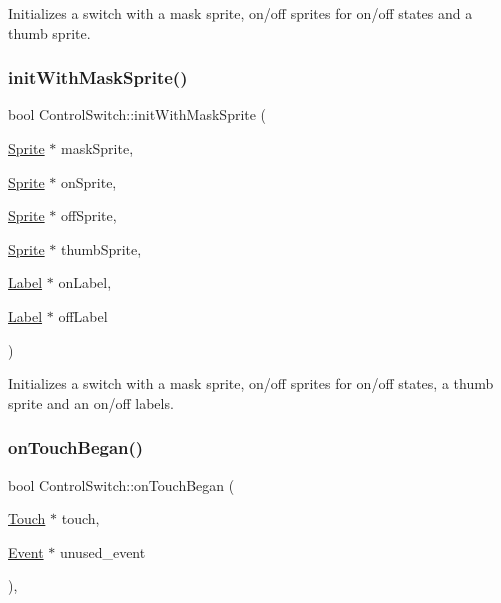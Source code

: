 Initializes a switch with a mask sprite, on/off sprites for on/off states and a thumb sprite. \mbox{\label{classControlSwitch_adea9bc3322f3cc28ea660cb5d4b02b65}} 
\subsubsection{\texorpdfstring{init\+With\+Mask\+Sprite()}{initWithMaskSprite()}\hspace{0.1cm}{\footnotesize\ttfamily [4/4]}}
{\footnotesize\ttfamily bool Control\+Switch\+::init\+With\+Mask\+Sprite (\begin{DoxyParamCaption}\item[{\hyperlink{classSprite}{Sprite} $\ast$}]{mask\+Sprite,  }\item[{\hyperlink{classSprite}{Sprite} $\ast$}]{on\+Sprite,  }\item[{\hyperlink{classSprite}{Sprite} $\ast$}]{off\+Sprite,  }\item[{\hyperlink{classSprite}{Sprite} $\ast$}]{thumb\+Sprite,  }\item[{\hyperlink{classLabel}{Label} $\ast$}]{on\+Label,  }\item[{\hyperlink{classLabel}{Label} $\ast$}]{off\+Label }\end{DoxyParamCaption})}

Initializes a switch with a mask sprite, on/off sprites for on/off states, a thumb sprite and an on/off labels. \mbox{\label{classControlSwitch_a67af886fe24ec32313023514b28991f3}} 
\subsubsection{\texorpdfstring{on\+Touch\+Began()}{onTouchBegan()}\hspace{0.1cm}{\footnotesize\ttfamily [1/2]}}
{\footnotesize\ttfamily bool Control\+Switch\+::on\+Touch\+Began (\begin{DoxyParamCaption}\item[{\hyperlink{classTouch}{Touch} $\ast$}]{touch,  }\item[{\hyperlink{classEvent}{Event} $\ast$}]{unused\+\_\+event }\end{DoxyParamCaption})\hspace{0.3cm}{\ttfamily [override]}, {\ttfamily [virtual]}}



